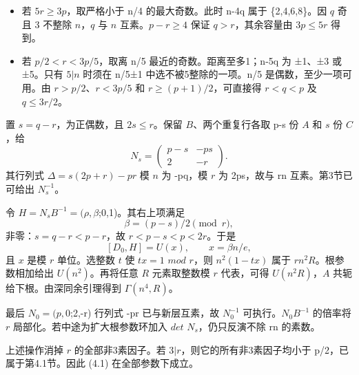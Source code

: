 \begin{itemize}
\tightlist
\item
  {若} {\ensuremath{5r\ge 3p}，取严格小于} {n/4} {的最大奇数。此时} {n-4q} {属于} {\{2,4,6,8\}。因} {\ensuremath{q}} {奇且} {3} {不整除} {\ensuremath{n}，\ensuremath{q}} {与} {\ensuremath{n}} {互素。\ensuremath{p-r\ge 4}} {保证} {\ensuremath{q>r}，其余容量由} {\ensuremath{3p\le 5r}} {得到。}
\item
  {若} {\ensuremath{p/2<r<3p/5}，取离} {n/5} {最近的奇数。距离至多1；n-5q} {为} {±1、±3} {或} {±5。只有} {\ensuremath{5|n}} {时须在} {n/5±1} {中选不被5整除的一项。n/5} {是偶数，至少一项可用。由} {\ensuremath{r>p/2}、\ensuremath{r<3p/5}} {和} {\ensuremath{r\ge (p+1)/2}，可直接得} {\ensuremath{r<q<p}} {及} {\ensuremath{q\le 3r/2}。}
\end{itemize}

{置} {\ensuremath{s=q-r}，为正偶数，且} {\ensuremath{2s\le r}。保留} {\ensuremath{B}、两个重复行各取} {p-s} {份} {\ensuremath{A}} {和} {\ensuremath{s}} {份} {\ensuremath{C}，给} \[
N_s=\begin{pmatrix}p-s&-ps\\2&-r\end{pmatrix}.
\] {其行列式} {\ensuremath{\Delta =s(2p+r)-pr}} {模} {\ensuremath{n}} {为} {-pq，模} {\ensuremath{r}} {为} {2ps，故与} {rn} {互素。第3节已可给出} {\ensuremath{N_{s}^{-1}}。}

{令} {\ensuremath{H=N_{s}B^{-1}=(\rho ,\beta };0,1)。其右上项满足} \[
\beta=(p-s)/2\pmod r,
\] {非零：\ensuremath{s=q-r<p-r}，故} {\ensuremath{r<p-s<p<2r}。于是} \[
[D_0,H]=U(x),\qquad x=\beta n/e,
\tag{C26.4.6}
\] {且} {\ensuremath{x}} {是模} {\ensuremath{r}} {单位。选整数} {\ensuremath{t}} {使} {\ensuremath{tx=1}} {\ensuremath{mod}} {\ensuremath{r}，则} {\ensuremath{n^{2}(1-tx)}} {属于} {\ensuremath{rn^{2}R}。根参数相加给出} {\ensuremath{U(n^{2})}。再将任意} {\ensuremath{R}} {元素取整数模} {\ensuremath{r}} {代表，可得} {\ensuremath{U(n^{2}R)}，\ensuremath{A}} {共轭给下根。由深同余引理得到} {\ensuremath{\Gamma (n^{4},R)}。}

{最后} {\ensuremath{N_{0}=(p,0};2,-r)} {行列式} {-pr} {已与新层互素，故} {\ensuremath{N_{0}^{-1}}} {可执行。\ensuremath{N_{0}B^{-1}}} {的倍率将} {\ensuremath{r}} {局部化。若中途为扩大根参数环加入} {\ensuremath{det}} {\ensuremath{N_{s}}，仍只反演不除} {rn} {的素数。}

{上述操作消掉} {\ensuremath{r}} {的全部非3素因子。若} {\ensuremath{3|r}，则它的所有非3素因子均小于} {p/2，已属于第4.1节。因此} {(4.1)} {在全部参数下成立。}

